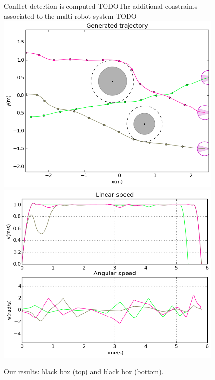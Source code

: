 \documentclass[eprint]{actapoly}
\begin{document}
\begin{figure}Conflict detection is computed TODOThe additional constraints associated to the multi robot system TODO  \centering
  \includegraphics[width=\linewidth]{./images/multirobot-path-224.png} %
  \\[3mm]
  \includegraphics[width=\linewidth]{./images/multirobot-vw.png} %
  \caption{Our results: black box (top) and black box (bottom).}
\label{fig:res}
\end{figure}
\end{document}

